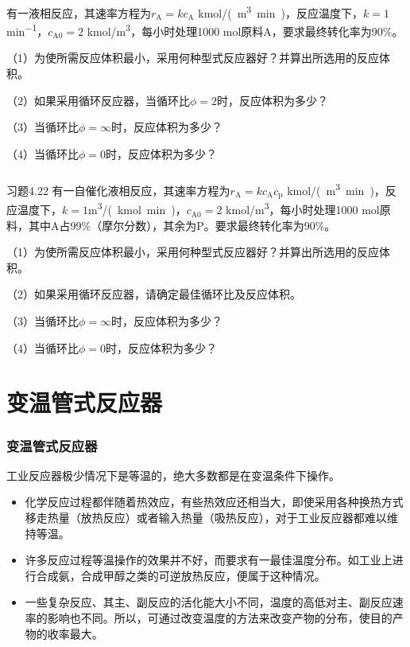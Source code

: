 \documentclass[dvipsnames, svgnames, x11names]{beamer}
\begin{document}
\begin{frame}[t]
    \frametitle{}
    \begin{question}
        有一液相反应，其速率方程为$r_\mathrm{A} = kc_\mathrm{A}$ \si{kmol/(m^3.min)}，反应温度下，$k=1$\si{min^{-1}}，$c_\mathrm{A0}=2$ \si{kmol/m^3}，每小时处理1000 mol原料A，要求最终转化率为90\%。
        
    （1）为使所需反应体积最小，采用何种型式反应器好？并算出所选用的反应体积。

    （2）如果采用循环反应器，当循环比$\phi = 2$时，反应体积为多少？

    （3）当循环比$\phi = \infty$时，反应体积为多少？

    （4）当循环比$\phi = 0$时，反应体积为多少？
    \end{question}
\end{frame}


\begin{frame}[t]
    \frametitle{}
    \begin{block}{习题4.22}
        有一自催化液相反应，其速率方程为$r_\mathrm{A} = kc_\mathrm{A}c_\mathrm{p}$ \si{kmol/(m^3.min)}，反应温度下，$k=1$\si{m^3/(kmol.min)}，$c_\mathrm{A0}=2$ \si{kmol/m^3}，每小时处理1000 mol原料，其中A占99\%（摩尔分数），其余为P。要求最终转化率为90\%。
        
    （1）为使所需反应体积最小，采用何种型式反应器好？并算出所选用的反应体积。

    （2）如果采用循环反应器，请确定最佳循环比及反应体积。

    （3）当循环比$\phi = \infty$时，反应体积为多少？

    （4）当循环比$\phi = 0$时，反应体积为多少？
    \end{block}
\end{frame}


\section{变温管式反应器}


\begin{frame}
    \frametitle{变温管式反应器}

    工业反应器极少情况下是等温的，绝大多数都是在变温条件下操作。
    \begin{itemize}
        \item 化学反应过程都伴随着热效应，有些热效应还相当大，即使采用各种换热方式移走热量（放热反应）或者输入热量（吸热反应），对于工业反应器都难以维持等温。
        \item 许多反应过程等温操作的效果并不好，而要求有一最佳温度分布。如工业上进行合成氨，合成甲醇之类的可逆放热反应，便属于这种情况。
        \item 一些复杂反应、其主、副反应的活化能大小不同，温度的高低对主、副反应速率的影响也不同。所以，可通过改变温度的方法来改变产物的分布，使目的产物的收率最大。
    \end{itemize}

\end{frame}
\end{document}
